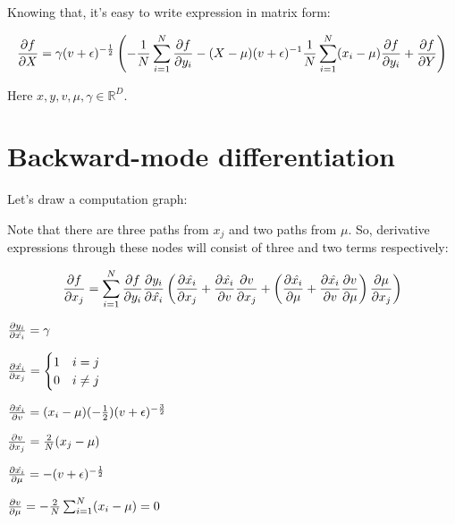 \documentclass[12pt]{article}
\begin{document}
Knowing that, it's easy to write expression in matrix form:

\[
	\pdv{f}{X} = \gamma (v + \epsilon)^{-\frac{1}{2}} \left( -\frac{1}{N} \sum_{i=1}^{N} \pdv{f}{y_i} - (X - \mu) (v + \epsilon)^{-1} \frac{1}{N} \sum_{i=1}^{N} (x_i - \mu) \pdv{f}{y_i} + \pdv{f}{Y} \right) 
\]

Here $x, y, v, \mu, \gamma \in \mathbb{R}^D$.

\section{Backward-mode differentiation}

Let's draw a computation graph:


Note that there are three paths from $x_j$ and two paths from $\mu$. So, derivative expressions through these nodes will consist of three and two terms respectively:

\[
	\pdv{f}{x_j} = 
	\sum_{i=1}^{N}
	\pdv{f}{y_i}
	\pdv{y_i}{\hat{x_i}} 
	\left( 
		\pdv{\hat{x_i}}{x_j} + 
		\pdv{\hat{x_i}}{v}\pdv{v}{x_j} + 
		\left( 
			\pdv{\hat{x_i}}{\mu} + 
			\pdv{\hat{x_i}}{v} \pdv{v}{\mu} 
		\right) 
		\pdv{\mu}{x_j} 
	\right) 
\]

$\pdv{y_i}{\hat{x_i}} = \gamma$

$
\pdv{\hat{x_i}}{x_j} = 
\begin{cases}
1 & \text{$i = j$} \\
0 & \text{$i \ne j$}
\end{cases}
$

$\pdv{\hat{x_i}}{v} = (x_i - \mu) (- \frac{1}{2}) (v + \epsilon)^{-\frac{3}{2}}$

$\pdv{v}{x_j} = \frac{2}{N} (x_j - \mu)$

$\pdv{\hat{x_i}}{\mu} = - (v + \epsilon)^{-\frac{1}{2}}$

$\pdv{v}{\mu} = - \frac{2}{N} \sum_{i=1}^{N} (x_i - \mu) = 0$
\end{document}
